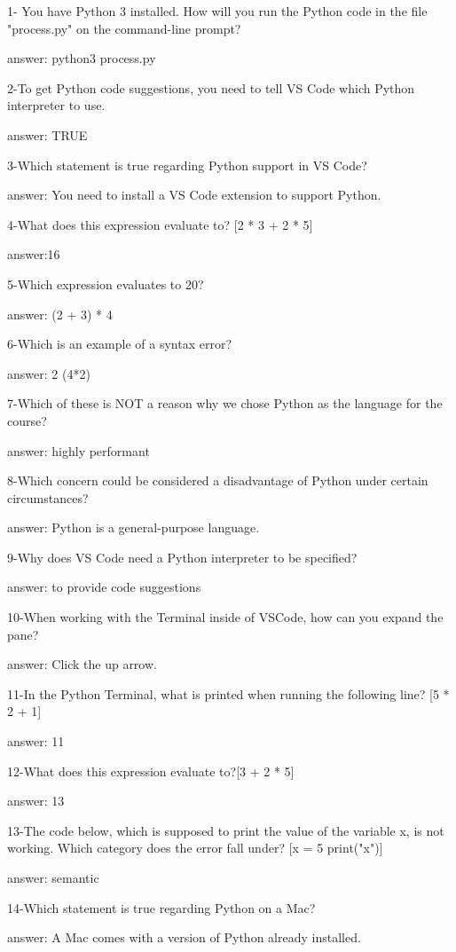 1- You have Python 3 installed. How will you run the Python code in the file "process.py" on the command-line prompt?

answer: python3 process.py

2-To get Python code suggestions, you need to tell VS Code which Python interpreter to use.

answer: TRUE

3-Which statement is true regarding Python support in VS Code?

answer: You need to install a VS Code extension to support Python.

4-What does this expression evaluate to? [2 * 3 + 2 * 5]

answer:16 

5-Which expression evaluates to 20?

answer: (2 + 3) * 4

6-Which is an example of a syntax error?

answer: 2 (4*2)

7-Which of these is NOT a reason why we chose Python as the language for the course?

answer: highly performant

8-Which concern could be considered a disadvantage of Python under certain circumstances?

answer: Python is a general-purpose language.

9-Why does VS Code need a Python interpreter to be specified?

answer: to provide code suggestions

10-When working with the Terminal inside of VSCode, how can you expand the pane?

answer: Click the up arrow.

11-In the Python Terminal, what is printed when running the following line? [5 * 2 + 1]

answer: 11

12-What does this expression evaluate to?[3 + 2 * 5]

answer: 13

13-The code below, which is supposed to print the value of the variable x, is not working. Which category does the error fall under?
[x = 5
 print("x")]

answer: semantic

14-Which statement is true regarding Python on a Mac?

answer: A Mac comes with a version of Python already installed.

